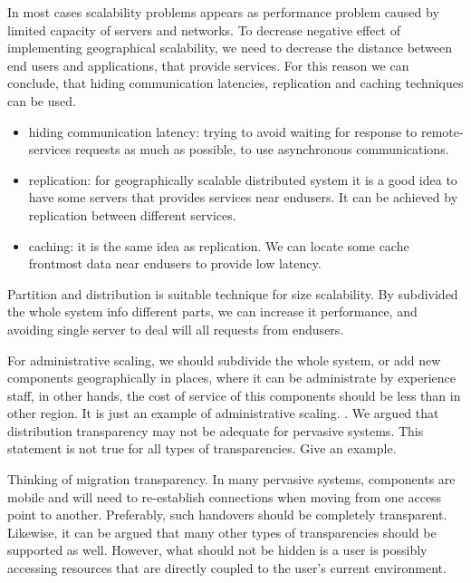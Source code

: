 \documentclass[12pt,a4paper]{report}
\begin{document}
In most cases scalability problems appears as performance problem caused by limited capacity of servers and networks. 
To decrease negative effect of implementing geographical scalability, we need to decrease  the distance between end users and applications, that provide services.  For this reason we can conclude, that hiding communication latencies, replication and caching techniques can be used.
\begin{itemize}
	\item{hiding communication latency: trying to avoid waiting for response to remote-services requests as much as possible, to use asynchronous communications.}
	\item{replication: for geographically scalable distributed system it is a good idea to have some servers that provides services near endusers. It can be achieved by replication between different services.}
	\item{caching: it is the same idea as replication. We can locate some cache frontmost data near endusers to provide low latency.}
\end{itemize}

Partition and distribution is suitable technique for size scalability. By subdivided the whole system info different parts, we can increase it performance, and avoiding single server to deal will all requests from endusers.

For administrative scaling, we should subdivide the whole system, or add new components geographically in places, where it can be administrate by experience staff, in other hands, the cost of service of this components should be less than in other region. It is just an example of administrative scaling.
. We argued that distribution transparency may not be adequate for pervasive systems. This statement is not true for all types of transparencies. Give an example.

Thinking of migration transparency. In many pervasive systems, components are mobile and will need to re-establish connections when moving from one access point to another. Preferably, such handovers should be completely transparent. Likewise, it can be argued that many other types of transparencies should be supported as well. However, what should not be hidden is a user is possibly accessing resources that are directly coupled to the user's current environment.
\end{document}
